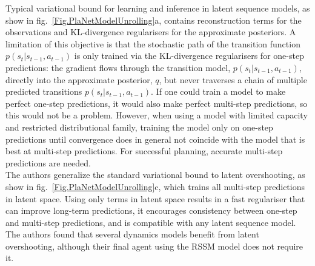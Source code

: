 Typical variational bound for learning and inference in latent sequence models, as show in fig.~\ref{Fig.PlaNetModelUnrolling}a, contains reconstruction terms for the observations and KL-divergence regularisers for the approximate posteriors. A limitation of this objective is that the stochastic path of the transition function $p(s_t | s_{t-1}, a_{t-1})$ is only trained via the KL-divergence regularisers for one-step predictions: the gradient flows through the transition model, $p(s_t | s_{t-1}, a_{t-1})$, directly into the approximate posterior, $q$, but never traverses a chain of multiple predicted transitions $p(s_t | s_{t-1}, a_{t-1})$. If one could train a model to make perfect one-step predictions, it would also make perfect multi-step predictions, so this would not be a problem. However, when using a model with limited capacity and restricted distributional family, training the model only on one-step predictions until convergence does in general not coincide with the model that is best at multi-step predictions. For successful planning, accurate multi-step predictions are needed. \\
The authors generalize the standard variational bound to latent overshooting, as show in fig.~\ref{Fig.PlaNetModelUnrolling}c, which trains all multi-step predictions in latent space. Using only terms in latent space results in a fast regulariser that can improve long-term predictions, it encourages consistency between one-step and multi-step predictions, and is compatible with any latent sequence model. \\
The authors found that several dynamics models benefit from latent overshooting, although their final agent using the RSSM model does not require it.

